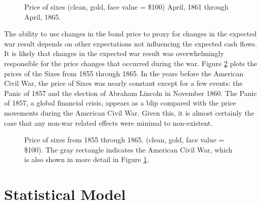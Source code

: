 \documentclass[11pt, oneside, article]{memoir}
\begin{document}
\begin{figure}[htpb]
  \centering
  \caption{Price of sixes (clean, gold, face value = \$100) April, 1861 through April, 1865.}
  \label{fig:sixes_price}
\end{figure}

The ability to use changes in the bond price to proxy for changes in the expected war result depends on other expectations not influencing the expected cash flows.
It is likely that changes in the expected war result was overwhelmingly responsible for the price changes that occurred during the war.
Figure \ref{fig:sixes_price_all} plots the prices of the Sixes from 1855 through 1865.
In the years before the American Civil War, the price of Sixes was nearly constant except for a few events: the Panic of 1857 and the election of Abraham Lincoln in November 1860.
The Panic of 1857, a global financial crisis, appears as a blip compared with the price movements during the American Civil War.
Given this, it is almost certainly the case that any non-war related effects were minimal to non-existent.

\begin{figure}[htpb]
  \centering
  \caption{Price of sixes from 1855 through 1865. (clean, gold, face value = \$100). 
  The gray rectangle indicates the American Civil War, which is also shown in more detail in Figure \ref{fig:sixes_price}.}
  \label{fig:sixes_price_all}
\end{figure}



\section{Statistical Model}
\label{sec:model}
\end{document}
